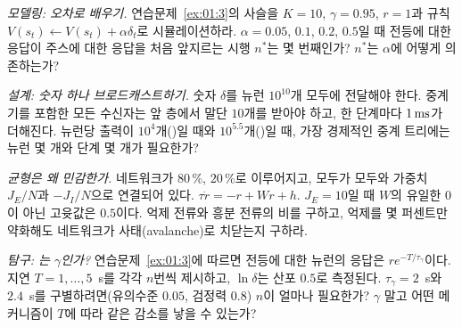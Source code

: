 \begin{exercise}[\lvlB]
\label{ex:01:4}
\emph{모델링: 오차로 배우기.} 연습문제~\ref{ex:01:3}의 사슬을 $K=10$, $\gamma=0.95$, $r=1$과 규칙 $V(s_t)\leftarrow V(s_t)+\alpha\delta_t$로 시뮬레이션하라. $\alpha=0.05$, $0.1$, $0.2$, $0.5$일 때 전등에 대한 응답이 주스에 대한 응답을 처음 앞지르는 시행 $n^*$는 몇 번째인가? $n^*$는 $\alpha$에 어떻게 의존하는가?
\end{exercise}

\begin{exercise}[\lvlB]
\label{ex:01:5}
\emph{설계: 숫자 하나 브로드캐스트하기.} 숫자 $\delta$를 뉴런 $10^{10}$개 모두에 전달해야 한다. 중계기를 포함한 모든 수신자는 앞 층에서 말단 $10$개를 받아야 하고, 한 단계마다 $1\,\text{ms}$가 더해진다. 뉴런당 출력이 $10^4$개()일 때와 $10^{5.5}$개()일 때, 가장 경제적인 중계 트리에는 뉴런 몇 개와 단계 몇 개가 필요한가?
\end{exercise}

\begin{exercise}[\lvlB]
\label{ex:01:6}
\emph{균형은 왜 민감한가.} 네트워크가  $80\,\%$,  $20\,\%$로 이루어지고, 모두가 모두와 가중치 $J_E/N$과 $-J_I/N$으로 연결되어 있다. $\tau\dot r=-r+Wr+h$. $J_E=10$일 때 $W$의 유일한 0이 아닌 고윳값은 $0.5$이다. 억제 전류와 흥분 전류의 비를 구하고, 억제를 몇 퍼센트만 약화해도 네트워크가 사태(avalanche)로 치닫는지 구하라.
\end{exercise}

\begin{exercise}[\lvlC]
\label{ex:01:7}
\emph{탐구: 는 $\gamma$인가?} 연습문제~\ref{ex:01:3}에 따르면 전등에 대한  뉴런의 응답은 $re^{-T/\tau_\gamma}$이다. 지연 $T=1,\dots,5$~s를 각각 $n$번씩 제시하고, $\ln\delta$는 산포 $0.5$로 측정된다. $\tau_\gamma=2$~s와 $2.4$~s를 구별하려면(유의수준 $0.05$, 검정력 $0.8$) $n$이 얼마나 필요한가? $\gamma$ 말고 어떤 메커니즘이 $T$에 따라 같은 감소를 낳을 수 있는가?
\end{exercise}
